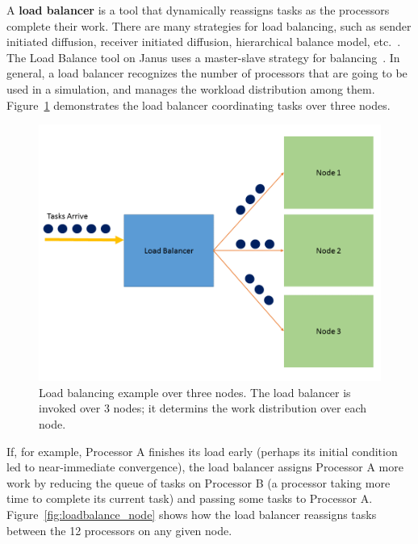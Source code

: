 A \textbf{load balancer} is a tool that dynamically reassigns tasks as the
processors complete their work. There are many strategies for load
balancing, such as sender initiated diffusion, receiver initiated
diffusion, hierarchical balance model, etc.~\cite{dlb}. The Load
Balance tool on Janus uses a master-slave strategy for
balancing~\cite{janus}. In general, a load balancer recognizes the
number of processors that are going to be used in a simulation, and manages
the workload distribution among
them. Figure~\ref{fig:loadbalance_overall} demonstrates the load
balancer coordinating tasks over three nodes. 
\begin{figure}[H]\linespread{1}   
\caption[Load balancing example]{Load balancing example over
  three nodes. The load balancer is invoked over 3 nodes; it determins
the work distribution over each node.}\label{fig:loadbalance_overall}
	\begin{center}
          \includegraphics[scale=0.35]{figs/loadbalance_overall.png}
	\end{center}
\end{figure}
If, for example, Processor A finishes its load early
(perhaps its initial condition led to near-immediate convergence),
the load balancer assigns Processor A more work by reducing the
queue of tasks on Processor B (a processor taking more time to complete its
current task) and passing some tasks to Processor A. Figure~\ref{fig:loadbalance_node}
shows how the load balancer reassigns tasks between the 12 processors
on any given node.
